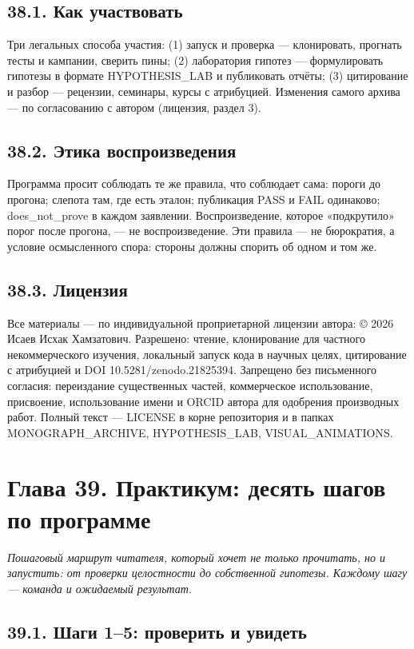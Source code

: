 \documentclass[11pt,a4paper]{article}
\begin{document}
\subsection{38.1. Как участвовать}

Три легальных способа участия: (1) запуск и проверка — клонировать, прогнать тесты и кампании, сверить пины; (2) лаборатория гипотез — формулировать гипотезы в формате HYPOTHESIS\_LAB и публиковать отчёты; (3) цитирование и разбор — рецензии, семинары, курсы с атрибуцией. Изменения самого архива — по согласованию с автором (лицензия, раздел 3).

\subsection{38.2. Этика воспроизведения}

Программа просит соблюдать те же правила, что соблюдает сама: пороги до прогона; слепота там, где есть эталон; публикация PASS и FAIL одинаково; does\_not\_prove в каждом заявлении. Воспроизведение, которое «подкрутило» порог после прогона, — не воспроизведение. Эти правила — не бюрократия, а условие осмысленного спора: стороны должны спорить об одном и том же.

\subsection{38.3. Лицензия}

Все материалы — по индивидуальной проприетарной лицензии автора: © 2026 Исаев Исхак Хамзатович. Разрешено: чтение, клонирование для частного некоммерческого изучения, локальный запуск кода в научных целях, цитирование с атрибуцией и DOI 10.5281/zenodo.21825394. Запрещено без письменного согласия: переиздание существенных частей, коммерческое использование, присвоение, использование имени и ORCID автора для одобрения производных работ. Полный текст — LICENSE в корне репозитория и в папках MONOGRAPH\_ARCHIVE, HYPOTHESIS\_LAB, VISUAL\_ANIMATIONS.

\section{Глава 39. Практикум: десять шагов по программе}

\noindent\textit{\color{copper}Пошаговый маршрут читателя, который хочет не только прочитать, но и запустить: от проверки целостности до собственной гипотезы. Каждому шагу — команда и ожидаемый результат.}

\subsection{39.1. Шаги 1–5: проверить и увидеть}
\end{document}
